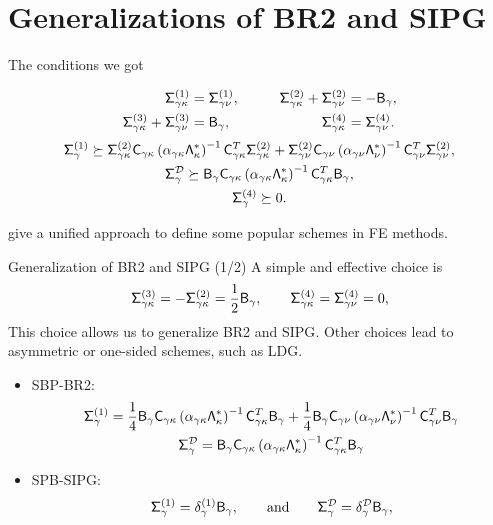 \documentclass{beamer}
\begin{document}
\section{Generalizations of BR2 and SIPG}
\begin{frame}
    The conditions we got
    \begin{block}{}
        \begin{equation*}
        \begin{aligned}
        \mathsf{\Sigma}_{\gamma\kappa}^{(1)} &= \mathsf{\Sigma}_{\gamma\nu} ^{(1)}, &\qquad  
        \mathsf{\Sigma}_{\gamma\kappa}^{(2)} + \mathsf{\Sigma}_{\gamma\nu} ^{(2)} &= -\mathsf{B}_{\gamma}, \\
        \mathsf{\Sigma}_{\gamma\kappa}^{(3)} + \mathsf{\Sigma}_{\gamma\nu} ^{(3)} &= \mathsf{B}_{\gamma}, &\qquad
        \mathsf{\Sigma}_{\gamma\kappa}^{(4)} &= \mathsf{\Sigma}_{\gamma\nu} ^{(4)}.
        \end{aligned}
        \end{equation*}
        \begin{gather*}
        \mathsf{\Sigma}_{\gamma}^{(1)} \succeq \mathsf{\Sigma}_{\gamma\kappa}^{(2)} \mathsf{C}_{\gamma\kappa}
        \left(\alpha_{\gamma\kappa}\mathsf{\Lambda}_{\kappa}^{*}\right)^{-1}\mathsf{C}_{\gamma\kappa}^T \mathsf{\Sigma}_{\gamma\kappa}^{(2)}
        + \mathsf{\Sigma}_{\gamma\nu} ^{(2)} \mathsf{C}_{\gamma\nu} \left(\alpha_{\gamma\nu} \mathsf{\Lambda}_{\nu}^{*}\right)^{-1}\mathsf{C}_{\gamma\nu}^T \mathsf{\Sigma}_{\gamma\nu} ^{(2)}, \\
        \mathsf{\Sigma}_{\gamma}^{\mathcal{D}} \succeq \mathsf{B}_{\gamma} \mathsf{C}_{\gamma\kappa}
        \left(\alpha_{\gamma\kappa}\mathsf{\Lambda}_{\kappa}^{*}\right)^{-1}\mathsf{C}_{\gamma\kappa}^T \mathsf{B}_{\gamma} ,\\
        \mathsf{\Sigma}_{\gamma}^{(4)} \succeq 0.
        \end{gather*}
    \end{block}
    give a unified approach to define some popular schemes in FE methods. 
\end{frame}
\begin{frame}{Generalization of BR2 and SIPG (1/2)}
    A simple and effective choice is
    \footnotesize
    \begin{equation*}
    \mathsf{\Sigma}_{\gamma\kappa}^{(3)} = -\mathsf{\Sigma}_{\gamma\kappa}^{(2)} = \frac{1}{2}\mathsf{B}_{\gamma}, \qquad
    \mathsf{\Sigma}_{\gamma\kappa}^{(4)} = \mathsf{\Sigma}_{\gamma\nu} ^{(4)} = 0,
    \end{equation*}
    \normalsize
    This choice allows us to generalize BR2\cite{Bassi2005} and SIPG\cite{hartmann:2007b}. Other choices lead to asymmetric or one-sided schemes, such as LDG\cite{Arnold2002}.
    \vskip 3mm
    \begin{itemize}
        \item SBP-BR2:
         \footnotesize
        \begin{gather*}
        \mathsf{\Sigma}_{\gamma}^{(1)} = \frac{1}{4}\mathsf{B}_{\gamma} \mathsf{C}_{\gamma\kappa}
        \left(\alpha_{\gamma\kappa}\mathsf{\Lambda}_{\kappa}^{*}\right)^{-1}\mathsf{C}_{\gamma\kappa}^T \mathsf{B}_{\gamma}
        + \frac{1}{4}\mathsf{B}_{\gamma} \mathsf{C}_{\gamma\nu} \left(\alpha_{\gamma\nu} \mathsf{\Lambda}_{\nu}^{*}\right)^{-1}\mathsf{C}_{\gamma\nu}^T \mathsf{B}_{\gamma} \\
        \mathsf{\Sigma}_{\gamma}^{\mathcal{D}} = \mathsf{B}_{\gamma} \mathsf{C}_{\gamma\kappa}
        \left(\alpha_{\gamma\kappa}\mathsf{\Lambda}_{\kappa}^{*}\right)^{-1}\mathsf{C}_{\gamma\kappa}^T \mathsf{B}_{\gamma}
        \end{gather*}
        \normalsize
        \item SPB-SIPG:
        \footnotesize
        \begin{equation*} 
        \mathsf{\Sigma}_{\gamma}^{(1)} = \delta_{\gamma}^{(1)} \mathsf{B}_{\gamma},
        \qquad\text{and}\qquad
        \mathsf{\Sigma}_{\gamma}^{\mathcal{D}} = \delta_{\gamma}^{\mathcal{D}} \mathsf{B}_{\gamma},
        \end{equation*}   
    \end{itemize}
\end{frame}
\end{document}

